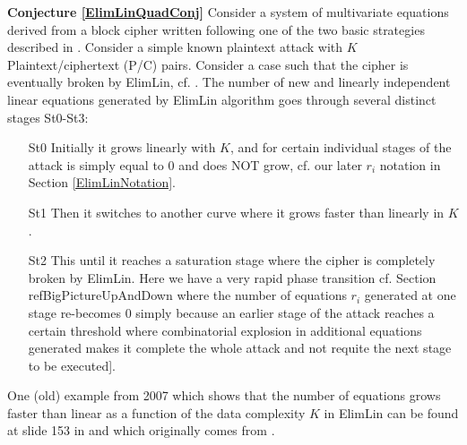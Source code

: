 {\bf Conjecture \ref{ElimLinQuadConj}}
\label{ElimLinQuadConj}
Consider a system of multivariate equations derived from a block cipher written following
one of the two basic strategies described in \cite{desalg,SlidesAlgAllteach}.
Consider a simple known plaintext attack with $K$ Plaintext/ciphertext (P/C) pairs.
Consider a case such that the cipher is eventually broken by ElimLin, cf. \cite{FastAlg,FastAlg2,ToyRijSer,AlgteachElimLinLab,RaddumSimon}.
The number of new and linearly independent linear equations generated
by ElimLin algorithm goes through several distinct stages St0-St3:

\begin{enumerate}
	\item[St0]
	Initially it grows linearly with $K$,
	and for certain individual stages of the attack is
	simply equal to 0 and does NOT grow,
	cf. our later $r_i$ notation in Section \ref{ElimLinNotation}.
	\item[St1]
	Then it switches to another curve where
	it grows faster than linearly in $K$.
	\item[St2]
	This until it reaches a saturation stage where the
	cipher is completely broken by ElimLin.
	Here we have a very rapid phase transition cf. Section ref{BigPictureUpAndDown}
	where the number of equations $r_i$ generated at one stage re-becomes 0
	simply because an earlier stage of the attack reaches a certain threshold where combinatorial explosion
	in additional equations generated
	makes it complete the whole attack and not requite the next stage to be executed].
\end{enumerate}

\noindent
One (old) example from 2007 which shows that the number of equations grows faster than linear
as a function of the data complexity $K$ in ElimLin
can be found at slide 153 in \cite{SlidesAlgAllteach}
and which originally comes from \cite{ToyRijSer}. 




